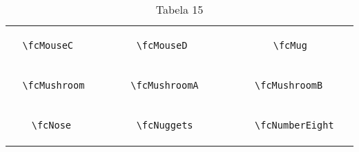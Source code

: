 \documentclass[x11names]{article}
\begin{document}
\begin{table}[H]
\begin{tabular}{|c|c|c|c|c|c|}
		&\multirow{5}{*}{	\fcMouseC	[scale=0.4]} & &\multirow{5}{*}{	\fcMouseD	[scale=0.4]} & &\multirow{5}{*}{	\fcMug	[scale=0.8]}\\	& & & & & \\	& & & & & \\	\verb|	\fcMouseC	| & & \verb|	\fcMouseD	| & & \verb|	\fcMug	| & \\	& & & & & \\	& & & & & \\	& & & & & \\	\hline									
		&\multirow{5}{*}{	\fcMushroom	[scale=0.4]} & &\multirow{5}{*}{	\fcMushroomA	[scale=0.4]} & &\multirow{5}{*}{	\fcMushroomB	[scale=0.4]}\\	& & & & & \\	& & & & & \\	\verb|	\fcMushroom	| & & \verb|	\fcMushroomA	| & & \verb|	\fcMushroomB	| & \\	& & & & & \\	& & & & & \\	& & & & & \\	\hline									
		&\multirow{5}{*}{	\fcNose	[scale=0.4]} & &\multirow{5}{*}{	\fcNuggets	[scale=0.4]} & &\multirow{5}{*}{	\fcNumberEight	[scale=0.4]}\\	& & & & & \\	& & & & & \\	\verb|	\fcNose	| & & \verb|	\fcNuggets	| & & \verb|	\fcNumberEight	| & \\	& & & & & \\	& & & & & \\	& & & & & \\		\hline 	\hline 	\end{tabular}	\caption{	Tabela 15	}\label{	Tab15	}\end{table}
\end{document}
